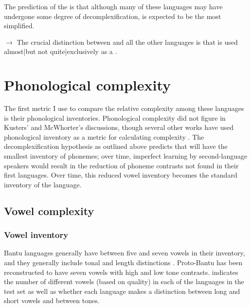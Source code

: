 \documentclass[output=paper,
modfonts
]{langscibook}
\begin{document}
	
	  The prediction of the  is that although many of these languages may have undergone some degree of decomplexification,  is expected to be the most simplified.
	 
		$\to$ The crucial distinction between  and all the other languages is that  is used almost|but not quite|exclusively as a .
		 \fi


\section{Phonological complexity}\label{sec:4:jerro}
The first metric I use to compare the relative complexity among these languages is their phonological inventories. Phonological complexity did not figure in Kusters' and McWhorter's discussions, though several other works have used phonological inventory as a metric for calculating complexity \citep{Hay2007,Nichols2009}. The decomplexification hypothesis as outlined above predicts that  will have the smallest inventory of phonemes; over time, imperfect learning by second-language speakers would result in the reduction of phoneme contrasts not found in their first languages. Over time, this reduced vowel inventory becomes the standard inventory of the language.

\subsection{Vowel complexity}

\subsubsection{Vowel inventory}
Bantu languages generally have between five and seven vowels in their inventory, and they generally include tonal and length distinctions \citep{Hyman2003, Maddieson2003}. Proto-Bantu has been reconstructed to have seven vowels with high and low tone contrasts.  indicates the number of different vowels (based on quality) in each of the languages in the test set as well as  whether each language makes a distinction between long and short vowels and between tones.  \\
\end{document}
